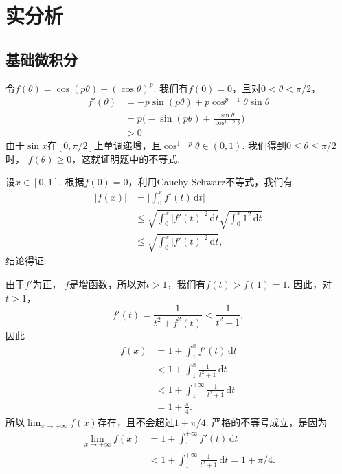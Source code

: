 \chapter{实分析}
\section{基础微积分}
\begin{ans}
  令$f(\theta)=\cos(p\theta)-(\cos\theta)^p$. 我们有$f(0)=0$，且对$0<\theta<\pi/2$，
  \begin{align*}
    f'(\theta) & = -p\sin(p\theta) + p\cos^{p-1}\theta\sin\theta\\
    & = p\Big( -\sin(p\theta) +\frac{\sin\theta}{\cos^{1-p}\theta} \Big)\\
    & >0
  \end{align*}
  由于$\sin x$在$[0,\pi/2]$上单调递增，且$\cos^{1-p}\theta\in(0,1)$. 我们得到$0\le\theta\le\pi/2$时， $f(\theta)\ge0$，这就证明题中的不等式.
\end{ans}

\begin{ans}
  设$x\in[0,1]$. 根据$f(0)=0$，利用Cauchy-Schwarz不等式，我们有
  \begin{align*}
    |f(x)| & = \Big|\int_0^x f'(t)\,\mathrm dt \Big|\\
           & \le \sqrt{\int_0^x|f'(t)|^2\,\mathrm dt}
           \sqrt{\int_0^x1^2\,\mathrm dt}\\
           & \le \sqrt{\int_0^x|f'(t)|^2\,\mathrm dt},
  \end{align*}
  结论得证.
\end{ans}

\begin{ans}
  由于$f'$为正， $f$是增函数，所以对$t>1$，我们有$f(t)>f(1)=1$. 因此，对$t>1$，
  \[ f'(t) =\frac1{t^2+f^2(t)}<\frac1{t^2+1}, \]
  因此
  \begin{align*}
    f(x) & = 1 + \int_1^xf'(t)\,\mathrm dt\\
         & < 1 + \int_1^x\frac1{t^2+1}\,\mathrm dt\\
         & < 1 + \int_1^{+\infty}\frac1{t^2+1}\,\mathrm dt\\
         & = 1+ \frac\pi4.
  \end{align*}
  所以$\lim_{x\to+\infty}f(x)$存在，且不会超过$1+\pi/4$. 严格的不等号成立，是因为
  \begin{align*}
    \lim_{x\to+\infty}f(x) & = 1 + \int_1^{+\infty}f'(t)\,\mathrm dt\\
     & < 1 + \int_1^{+\infty}\frac1{t^2+1}\,\mathrm dt
     = 1 + \pi/4.
  \end{align*}
\end{ans}

